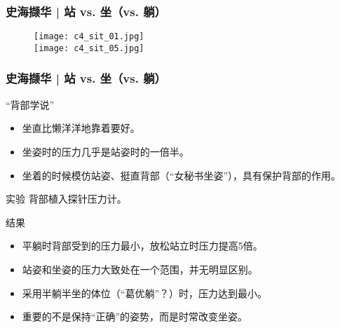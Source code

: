 \begin{frame}
  \frametitle{史海撷华 | 站 vs. 坐（vs. 躺）}
  \begin{figure}
    \centering
    \texttt{[image: c4\_sit\_01.jpg]}\\
    \texttt{[image: c4\_sit\_05.jpg]}
  \end{figure}
\end{frame}

\begin{frame}
  \frametitle{史海撷华 | 站 vs. 坐（vs. 躺）}
  \begin{block}{“背部学说”}
    \begin{itemize}
      \item 坐直比懒洋洋地靠着要好。
      \item 坐姿时的压力几乎是站姿时的一倍半。
      \item 坐着的时候模仿站姿、挺直背部（“女秘书坐姿”），具有保护背部的作用。
    \end{itemize}
  \end{block}
  \vspace{-0.5em}
  \pause
  \begin{block}{实验}
    背部植入探针压力计。
  \end{block}
  \vspace{-0.5em}
  \pause
  \begin{block}{结果}
    \begin{itemize}
      \item 平躺时背部受到的压力最小，放松站立时压力提高5倍。
      \item 站姿和坐姿的压力大致处在一个范围，并无明显区别。
      \item 采用半躺半坐的体位（“葛优躺”？）时，压力达到最小。
      \item \alert{重要的不是保持“正确”的姿势，而是时常改变坐姿。}
    \end{itemize}
  \end{block}
\end{frame}

